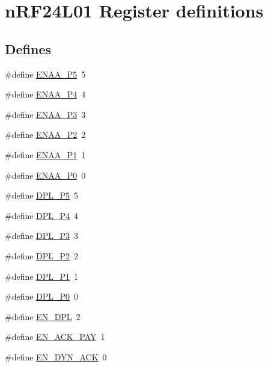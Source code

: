 \hypertarget{group__nordic__hal__nrf__reg}{
\section{nRF24L01 Register definitions}
\label{group__nordic__hal__nrf__reg}
}
\subsection*{Defines}
\begin{DoxyCompactItemize}
\item 
\#define \hyperlink{group__nordic__hal__nrf__reg_gae28c4601af8b2f85827386fe9a27f9fa}{ENAA\_\-P5}~5
\item 
\#define \hyperlink{group__nordic__hal__nrf__reg_ga3b5bebd442d3a0351e85100a69244810}{ENAA\_\-P4}~4
\item 
\#define \hyperlink{group__nordic__hal__nrf__reg_gaade4fe5e884e4f5868daf2c706d72f5e}{ENAA\_\-P3}~3
\item 
\#define \hyperlink{group__nordic__hal__nrf__reg_ga8b3d7771adbc5bc2bd8846f00aa39a5a}{ENAA\_\-P2}~2
\item 
\#define \hyperlink{group__nordic__hal__nrf__reg_gadfa71d5ebb7107d673674bb10279d9c6}{ENAA\_\-P1}~1
\item 
\#define \hyperlink{group__nordic__hal__nrf__reg_ga2cb97a8f9d05bb511d45d7212174769d}{ENAA\_\-P0}~0
\item 
\#define \hyperlink{group__nordic__hal__nrf__reg_ga8907dbd1fe9dfedbaf8824dbfcfd4f65}{DPL\_\-P5}~5
\item 
\#define \hyperlink{group__nordic__hal__nrf__reg_ga7fc41c509a5885a7199535d72f8223bf}{DPL\_\-P4}~4
\item 
\#define \hyperlink{group__nordic__hal__nrf__reg_gad855ab4dab05150b03716fea1fc8ddb6}{DPL\_\-P3}~3
\item 
\#define \hyperlink{group__nordic__hal__nrf__reg_ga444b8f6d5091149c983f6fca29775a44}{DPL\_\-P2}~2
\item 
\#define \hyperlink{group__nordic__hal__nrf__reg_gaae58d2c6834305858a405abaffd95049}{DPL\_\-P1}~1
\item 
\#define \hyperlink{group__nordic__hal__nrf__reg_gacf457ec76fbdc9fe3a5d3eb3e9c5dca5}{DPL\_\-P0}~0
\item 
\#define \hyperlink{group__nordic__hal__nrf__reg_ga1b46f8336bda068b0759f70cceec3b65}{EN\_\-DPL}~2
\item 
\#define \hyperlink{group__nordic__hal__nrf__reg_ga1a275ad559fa85d8278f06052baab004}{EN\_\-ACK\_\-PAY}~1
\item 
\#define \hyperlink{group__nordic__hal__nrf__reg_ga2c72793d172b16436d7e0c0d9491bdae}{EN\_\-DYN\_\-ACK}~0
\end{DoxyCompactItemize}

